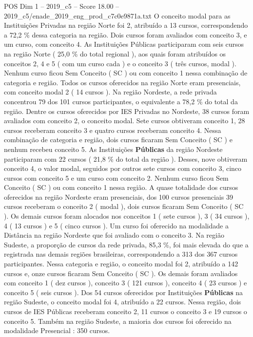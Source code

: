 \begin{textsample}{POS Dim 1 – 2019\_c5 – Score 18.00 – 2019\_c5/enade\_2019\_eng\_prod\_c7c0e9871a.txt}
O conceito modal para as Instituições Privadas na região Norte foi 2, atribuído a 13 cursos, correspondendo a 72,2 \% dessa categoria na região.
Dois cursos foram avaliados com conceito 3, e um curso, com conceito 4.
As Instituições Públicas participaram com seis cursos na região Norte ( 25,0 \% do total regional ), aos quais foram atribuídos os conceitos 2, 4 e 5 ( com um curso cada ) e o conceito 3 ( três cursos, modal ).
Nenhum curso ficou Sem Conceito ( SC ) ou com conceito 1 nessa combinação de categoria e região.
Todos os cursos oferecidos na região Norte eram presenciais, com conceito modal 2 ( 14 cursos ).
Na região Nordeste, a rede privada concentrou 79 dos 101 cursos participantes, o equivalente a 78,2 \% do total da região.
Dentre os cursos oferecidos por IES Privadas no Nordeste, 38 cursos foram avaliados com conceito 2, o conceito modal.
Sete cursos obtiveram conceito 1, 28 cursos receberam conceito 3 e quatro cursos receberam conceito 4.
Nessa combinação de categoria e região, dois cursos ficaram Sem Conceito ( SC ) e nenhum recebeu conceito 5.
As Instituições \textbf{Públicas} da região Nordeste participaram com 22 cursos ( 21,8 \% do total da região ).
Desses, nove obtiveram conceito 4, o valor modal, seguidos por outros sete cursos com conceito 3, cinco cursos com conceito 5 e um curso com conceito 2.
Nenhum curso ficou Sem Conceito ( SC ) ou com conceito 1 nessa região.
A quase totalidade dos cursos oferecidos na região Nordeste eram presenciais, dos 100 cursos presenciais 39 cursos receberam o conceito 2 ( modal ), dois cursos ficaram Sem Conceito ( SC ).
Os demais cursos foram alocados nos conceitos 1 ( sete cursos ), 3 ( 34 cursos ), 4 ( 13 cursos ) e 5 ( cinco cursos ).
Um curso foi oferecido na modalidade a Distância na região Nordeste que foi avaliado com o conceito 3.
Na região Sudeste, a proporção de cursos da rede privada, 85,3 \%, foi mais elevada do que a registrada nas demais regiões brasileiras, correspondendo a 313 dos 367 cursos participantes.
Nessa categoria e região, o conceito modal foi 2, atribuído a 142 cursos e, onze cursos ficaram Sem Conceito ( SC ).
Os demais foram avaliados com conceito 1 ( dez cursos ), conceito 3 ( 121 cursos ), conceito 4 ( 23 cursos ) e conceito 5 ( seis cursos ).
Dos 54 cursos oferecidos por Instituições \textbf{Públicas} na região Sudeste, o conceito modal foi 4, atribuído a 22 cursos.
Nessa região, dois cursos de IES Públicas receberam conceito 2, 11 cursos o conceito 3 e 19 cursos o conceito 5.
Também na região Sudeste, a maioria dos cursos foi oferecido na modalidade Presencial : 350 cursos.

\end{textsample}
